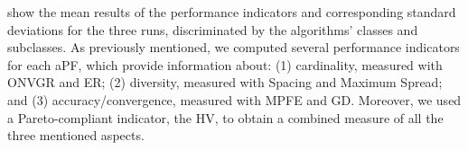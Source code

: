  show the mean results of the performance indicators and corresponding standard deviations for the three runs, discriminated by the algorithms' classes and subclasses. As previously mentioned, we computed several performance indicators for each \ac{aPF}, which provide information about: (1) cardinality, measured with \ac{ONVGR} and \ac{ER}; (2) diversity, measured with Spacing and Maximum Spread; and (3) accuracy/convergence, measured with \ac{MPFE} and \ac{GD}. Moreover, we used a Pareto-compliant indicator, the \ac{HV}, to obtain a combined measure of all the three mentioned aspects. %

